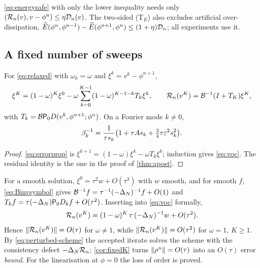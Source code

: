 \begin{remark}\label{rem:onesided}
\eqref{eq:energysafe} with only the lower inequality needs only $(\mathcal{R}_n(v),v-\phi^n)\le\eta\mathcal{D}_n(v)$. The two-sided (T$_E$) also excludes artificial over-dissipation, $\widetilde{E}(\phi^n,\phi^{n-1})-\widetilde{E}(\phi^{n+1},\phi^n)\le(1+\eta)\mathcal{D}_n$; all experiments use it.
\end{remark}

\subsection{A fixed number of sweeps}\label{sec:fixedK}
\begin{proposition}\label{prop:fixedK}
For \eqref{eq:relaxed} with $\omega_k=\omega$ and $\xi^k=v^k-\phi^{n+1}$,
\begin{equation}\label{eq:voc}
\xi^K=(1-\omega)^K\xi^0-\omega\sum_{k=0}^{K-1}(1-\omega)^{K-1-k}T_k\xi^k,\qquad \mathcal{R}_n(v^K)=\mathcal{B}^{-1}(I+T_K)\xi^K,
\end{equation}
with $T_k=\mathcal{B}\mathsf{P}_0 D(v^k,\phi^{n+1};\phi^n)$. On a Fourier mode $k\ne0$,
\begin{equation}\label{eq:Binvsymbol}
\beta_k^{-1}=\frac1{\tau s_k}\big(1+\tau As_k+\tfrac34\tau\varepsilon^2s_k^2\big).
\end{equation}
\end{proposition}

\begin{proof}
\eqref{eq:errorprop} is $\xi^{k+1}=(1-\omega)\xi^k-\omega T_k\xi^k$; induction gives \eqref{eq:voc}. The residual identity is the one in the proof of \cref{thm:apost}.
\end{proof}

For a smooth solution, $\xi^0=\tau^2w+O(\tau^3)$ with $w$ smooth, and for smooth $f$, \eqref{eq:Binvsymbol} gives $\mathcal{B}^{-1}f=\tau^{-1}(-\Delta_N)^{-1}f+O(1)$ and $T_kf=\tau(-\Delta_N)\mathsf{P}_0 D_kf+O(\tau^2)$. Inserting into \eqref{eq:voc} formally,
\begin{equation}\label{eq:fixedKres}
\mathcal{R}_n(v^K)=(1-\omega)^K\,\tau\,(-\Delta_N)^{-1}w+O(\tau^2).
\end{equation}
Hence $\lVert \mathcal{R}_n(v^K)\rVert=O(\tau)$ for $\omega\ne1$, while $\lVert \mathcal{R}_n(v^K)\rVert=O(\tau^2)$ for $\omega=1$, $K\ge1$. By \eqref{eq:perturbed-scheme} the accepted iterate solves the scheme with the consistency defect $-\Delta_N\mathcal{R}_n$; \cref{cor:fixedK} turns $\lVert \rho^n\rVert=O(\tau)$ into an $O(\tau)$ error \emph{bound}. For the linearisation at $\phi=0$ the loss of order is proved.

